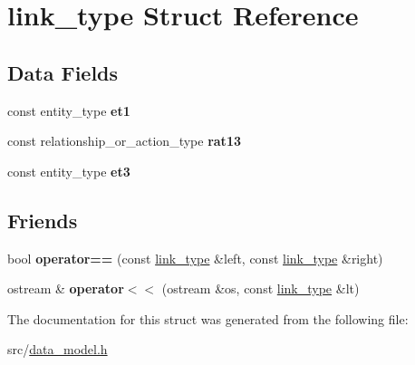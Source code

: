 \hypertarget{structlink__type}{}\section{link\+\_\+type Struct Reference}
\label{structlink__type}
\subsection*{Data Fields}
\begin{DoxyCompactItemize}
\item 
\mbox{\label{structlink__type_aa1e1406306efb10b6c71e6425df2405d}} 
const entity\+\_\+type {\bfseries et1}
\item 
\mbox{\label{structlink__type_ac178aea7e3b72e3579ea365625291c4a}} 
const relationship\+\_\+or\+\_\+action\+\_\+type {\bfseries rat13}
\item 
\mbox{\label{structlink__type_a5d2db20b11fedaab93e193fce2e205a8}} 
const entity\+\_\+type {\bfseries et3}
\end{DoxyCompactItemize}
\subsection*{Friends}
\begin{DoxyCompactItemize}
\item 
\mbox{\label{structlink__type_ae75460e218908d70af1163248317096e}} 
bool {\bfseries operator==} (const \hyperlink{structlink__type}{link\+\_\+type} \&left, const \hyperlink{structlink__type}{link\+\_\+type} \&right)
\item 
\mbox{\label{structlink__type_a3b1d9aca31b4d38961fafd8f10732bea}} 
ostream \& {\bfseries operator$<$$<$} (ostream \&os, const \hyperlink{structlink__type}{link\+\_\+type} \&lt)
\end{DoxyCompactItemize}


The documentation for this struct was generated from the following file\+:\begin{DoxyCompactItemize}
\item 
src/\hyperlink{data__model_8h}{data\+\_\+model.\+h}\end{DoxyCompactItemize}
